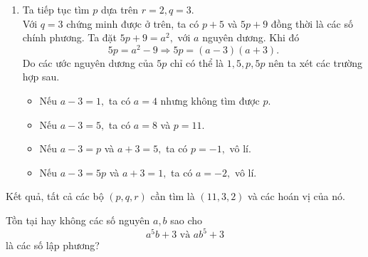 \begin{gbtt}
{\begin{enumerate}
\begin{itemize}
\begin{center}
        \end{center}
        Dựa theo bảng, ta thấy hai điều kiện $p+q+2$ không chia hết cho $3$ và $pq+2p+2q+3$ chính phương không đồng thời xảy ra, một điều mâu thuẫn. Như vậy $q=3.$
    \end{itemize}
    \item Ta tiếp tục tìm $p$ dựa trên $r=2,q=3.$\\ Với $q=3$ chứng minh được ở trên, ta có $p+5$ và $5p+9$ đồng thời là các số chính phương. Ta đặt $5p+9=a^2,$ với $a$ nguyên dương. Khi đó
    $$5p=a^2-9\Rightarrow 5p=(a-3)(a+3).$$
    Do các ước nguyên dương của $5p$ chỉ có thể là $1,5,p,5p$ nên ta xét các trường hợp sau.
    \begin{itemize}
        \item Nếu $a-3=1,$ ta có $a=4$ nhưng không tìm được $p.$
        \item Nếu $a-3=5,$ ta có $a=8$ và $p=11.$
        \item Nếu $a-3=p$ và $a+3=5,$ ta có $p=-1,$ vô lí.
        \item Nếu $a-3=5p$ và $a+3=1,$ ta có $a=-2,$ vô lí.
    \end{itemize}
\end{enumerate}
Kết quả, tất cả các bộ $(p,q,r)$ cần tìm là $(11,3,2)$ và các hoán vị của nó.}
\end{gbtt}

\begin{gbtt}
Tồn tại hay không các số nguyên $a,b$ sao cho $$a^5b+3\text{ và }ab^5+3$$
là các số lập phương?
\end{gbtt}

